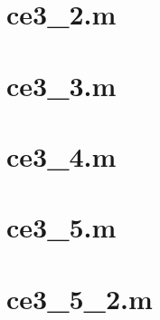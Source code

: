 \documentclass[a4paper,11pt]{article}
\begin{document}
\begin{appendices}
\section{ce3\_2.m}
\label{app:ce3_2}


\section{ce3\_3.m}
\label{app:ce3_3}


\section{ce3\_4.m}
\label{app:ce3_4}


\section{ce3\_5.m}
\label{app:ce3_5}


\section{ce3\_5\_2.m}
\label{app:ce3_5_2}


\end{appendices}
\end{document}
